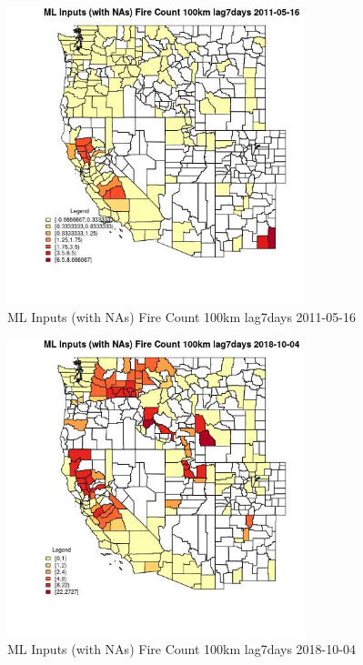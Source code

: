 \begin{figure} 
\centering  
\includegraphics[width=0.77\textwidth]{Code_Outputs/Report_ML_input_PM25_Step4_part_f_de_duplicated_aves_prioritize_24hr_obswNAs_CountyFire_Count_100km_lag7daysMean2011-05-16.jpg} 
\caption{\label{fig:Report_ML_input_PM25_Step4_part_f_de_duplicated_aves_prioritize_24hr_obswNAsCountyFire_Count_100km_lag7daysMean2011-05-16}ML Inputs (with NAs) Fire Count 100km lag7days 2011-05-16} 
\end{figure} 
 

\begin{figure} 
\centering  
\includegraphics[width=0.77\textwidth]{Code_Outputs/Report_ML_input_PM25_Step4_part_f_de_duplicated_aves_prioritize_24hr_obswNAs_CountyFire_Count_100km_lag7daysMean2018-10-04.jpg} 
\caption{\label{fig:Report_ML_input_PM25_Step4_part_f_de_duplicated_aves_prioritize_24hr_obswNAsCountyFire_Count_100km_lag7daysMean2018-10-04}ML Inputs (with NAs) Fire Count 100km lag7days 2018-10-04} 
\end{figure} 
 

